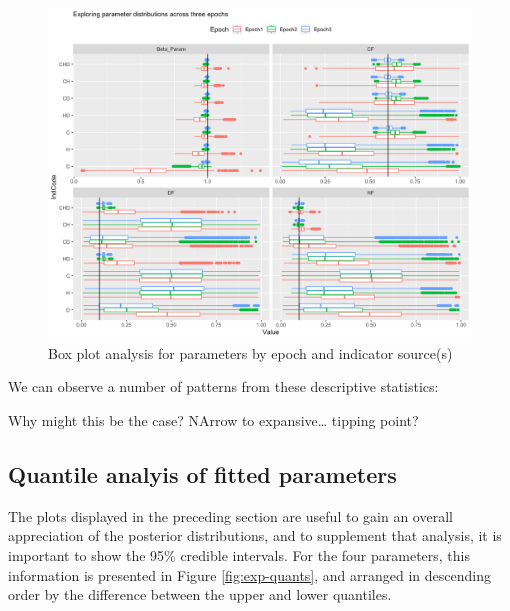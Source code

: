 \documentclass[10pt,letterpaper]{article}
\begin{document}
\begin{figure}
\includegraphics[width=1\linewidth]{diagrams/exp_boxplots} \caption{Box plot analysis for parameters by epoch and indicator source(s)}\label{fig:exp-boxplots}
\end{figure}

We can observe a number of patterns from these descriptive statistics:

Why might this be the case? NArrow to expansive\ldots{} tipping point?

\hypertarget{quantile-analyis-of-fitted-parameters}{%
\subsection{Quantile analyis of fitted parameters}\label{quantile-analyis-of-fitted-parameters}}

The plots displayed in the preceding section are useful to gain an overall appreciation of the posterior distributions, and to supplement that analysis, it is important to show the 95\% credible intervals. For the four parameters, this information is presented in Figure \ref{fig:exp-quants}, and arranged in descending order by the difference between the upper and lower quantiles.
\end{document}
